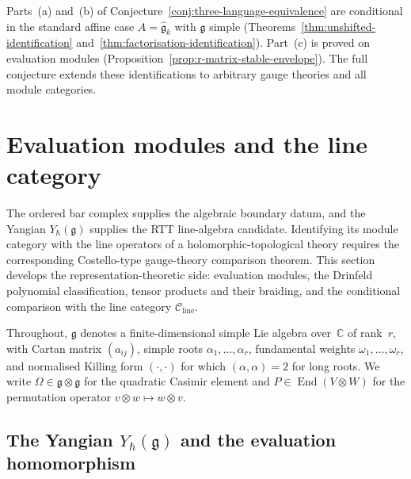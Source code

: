 \begin{remark}
Parts~(a) and~(b) of Conjecture~\ref{conj:three-language-equivalence}
are conditional in the standard affine case
$A = \widehat{\mathfrak{g}}_k$ with $\mathfrak{g}$ simple
(Theorems~\ref{thm:unshifted-identification}
and~\ref{thm:factorisation-identification}). Part~(c)
is proved on evaluation modules
(Proposition~\ref{prop:r-matrix-stable-envelope}). The full conjecture
extends these identifications to arbitrary gauge theories and all
module categories.
\end{remark}


\section{Evaluation modules and the line category}
\label{sec:evaluation-modules}

The ordered bar complex supplies the algebraic boundary datum, and the
Yangian $Y_\hbar(\mathfrak{g})$ supplies the RTT line-algebra
candidate. Identifying its module category with the line operators of a
holomorphic-topological theory requires the corresponding
Costello-type gauge-theory comparison theorem. This section develops
the representation-theoretic side: evaluation modules, the Drinfeld
polynomial classification, tensor products and their braiding, and the
conditional comparison with the line category
$\mathcal{C}_{\mathrm{line}}$.

Throughout, $\mathfrak{g}$ denotes a finite-dimensional simple Lie algebra
over~$\mathbb{C}$ of rank~$r$, with Cartan matrix $(a_{ij})$,
simple roots $\alpha_1,\dots,\alpha_r$, fundamental weights
$\omega_1,\dots,\omega_r$, and normalised Killing form
$(\cdot,\cdot)$ for which $(\alpha,\alpha)=2$ for long roots. We write
$\Omega\in\mathfrak{g}\otimes\mathfrak{g}$ for the quadratic Casimir element
and $P\in\operatorname{End}(V\otimes W)$ for the permutation operator
$v\otimes w\mapsto w\otimes v$.

\subsection{The Yangian $Y_\hbar(\mathfrak{g})$ and the evaluation homomorphism}

